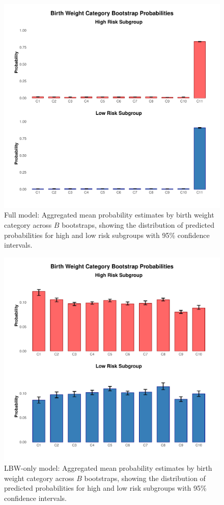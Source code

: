 \begin{figure}
    \centering
    \includegraphics[width=1\textwidth]{chapters/chapter3/figures/high_low_risk_full.pdf}
    \caption{Full model: Aggregated mean probability estimates by birth weight category across $B$ bootstraps, showing the distribution of predicted probabilities for high and low risk subgroups with 95\% confidence intervals.}
    \label{fig:high-low-risk-full}
\end{figure}

\begin{figure}
    \centering
    \includegraphics[width=1\textwidth]{chapters/chapter3/figures/high_low_risk_small.pdf}
    \caption{LBW-only model: Aggregated mean probability estimates by birth weight category across $B$ bootstraps, showing the distribution of predicted probabilities for high and low risk subgroups with 95\% confidence intervals.}
    \label{fig:high-low-risk-lbw}
\end{figure}


